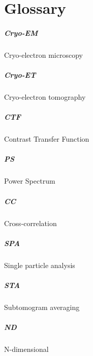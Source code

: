 \chapter{Glossary}

\paragraph{Cryo-EM} Cryo-electron microscopy
\paragraph{Cryo-ET} Cryo-electron tomography
\paragraph{CTF} Contrast Transfer Function
\paragraph{PS} Power Spectrum
\paragraph{CC} Cross-correlation
\paragraph{SPA} Single particle analysis
\paragraph{STA} Subtomogram averaging
\paragraph{ND} N-dimensional

